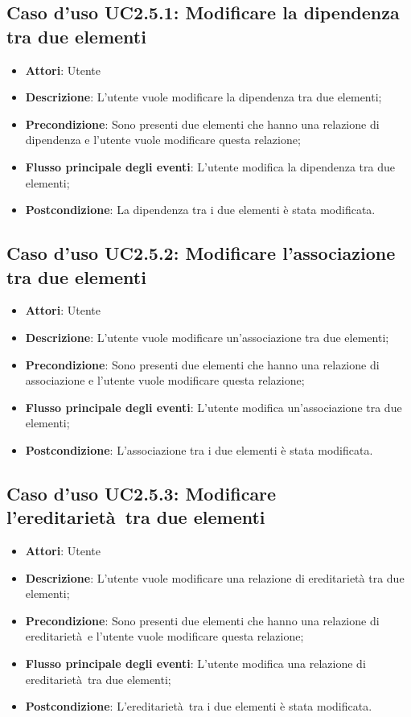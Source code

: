 \documentclass[../AnalisiDeiRequisiti.tex]{subfiles}
\begin{document}
		\subsection{Caso d'uso UC2.5.1: Modificare la dipendenza tra due elementi}
		\begin{itemize}
			\item \textbf{Attori}: Utente
			\item \textbf{Descrizione}: L'utente vuole modificare la dipendenza tra due elementi;
			\item \textbf{Precondizione}: Sono presenti due elementi che hanno una relazione di dipendenza e l'utente vuole modificare questa relazione;
			\item \textbf{Flusso principale degli eventi}: L'utente modifica la dipendenza tra due elementi;
			\item \textbf{Postcondizione}: La dipendenza tra i due elementi è stata modificata.
		\end{itemize}
		\subsection{Caso d'uso UC2.5.2: Modificare l'associazione tra due elementi}
		\begin{itemize}
			\item \textbf{Attori}: Utente
			\item \textbf{Descrizione}: L'utente vuole modificare un'associazione tra due elementi;
			\item \textbf{Precondizione}: Sono presenti due elementi che hanno una relazione di associazione e l'utente vuole modificare questa relazione;
			\item \textbf{Flusso principale degli eventi}: L'utente modifica un'associazione tra due elementi;
			\item \textbf{Postcondizione}: L'associazione tra i due elementi è stata modificata.
		\end{itemize}
		\subsection{Caso d'uso UC2.5.3: Modificare l'ereditarietà tra due elementi}
		\begin{itemize}
			\item \textbf{Attori}: Utente
			\item \textbf{Descrizione}: L'utente vuole modificare una relazione di ereditarietà tra due elementi;
			\item \textbf{Precondizione}: Sono presenti due elementi che hanno una relazione di ereditarietà e l'utente vuole modificare questa relazione;
			\item \textbf{Flusso principale degli eventi}: L'utente modifica una relazione di ereditarietà tra due elementi;
			\item \textbf{Postcondizione}: L'ereditarietà tra i due elementi è stata modificata.
		\end{itemize}
\end{document}
